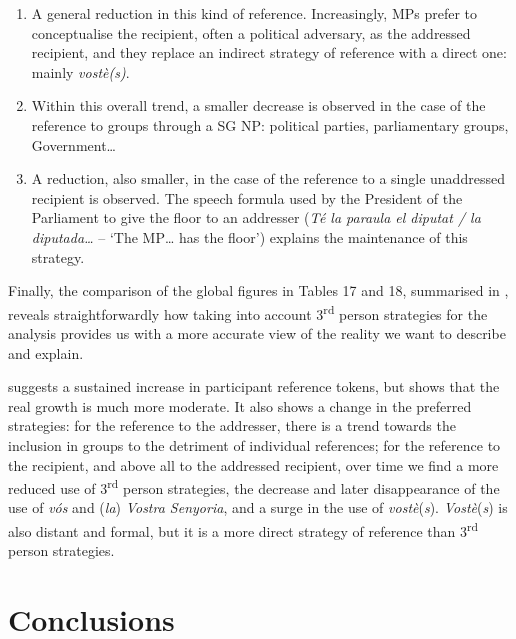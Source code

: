 \documentclass[output=paper]{langscibook}
\begin{document}
\begin{enumerate}

\item A general reduction in this kind of reference. Increasingly, MPs prefer to conceptualise the recipient, often a political adversary, as the addressed recipient, and they replace an indirect strategy of reference with a direct one: mainly \textit{vostè(s)}.

\item Within this overall trend, a smaller decrease is observed in the case of the reference to groups through a SG NP: political parties, parliamentary groups, Government…

\item A reduction, also smaller, in the case of the reference to a single unaddressed recipient is observed. The speech formula used by the President of the Parliament to give the floor to an addresser (\textit{Té la paraula el diputat / la diputada…} – ‘The MP… has the floor’) explains the maintenance of this strategy.
\end{enumerate}


Finally, the comparison of the global figures in Tables 17 and 18, summarised in , reveals straightforwardly how taking into account 3\textsuperscript{rd} person strategies for the analysis provides us with a more accurate view of the reality we want to describe and explain.


 suggests a sustained increase in participant reference tokens, but  shows that the real growth is much more moderate. It also shows a change in the preferred strategies: for the reference to the addresser, there is a trend towards the inclusion in groups to the detriment of individual references; for the reference to the recipient, and above all to the addressed recipient, over time we find a more reduced use of 3\textsuperscript{rd} person strategies, the decrease and later disappearance of the use of \textit{vós} and (\textit{la}) \textit{Vostra Senyoria}, and a surge in the use of \textit{vostè}(\textit{s}). \textit{Vostè}(\textit{s}) is also distant and formal, but it is a more direct strategy of reference than 3\textsuperscript{rd} person strategies.



\section{Conclusions}\label{sec:nogue:4}
\end{document}
